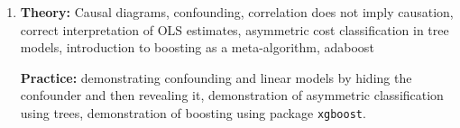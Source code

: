 \begin{enumerate}[(1)]
\item \textbf{Theory:} Causal diagrams, confounding, correlation does not imply causation, correct interpretation of OLS estimates, asymmetric cost classification in tree models, introduction to boosting as a meta-algorithm, adaboost

\textbf{Practice:} demonstrating confounding and linear models by hiding the confounder and then revealing it, demonstration of asymmetric classification using trees, demonstration of boosting using package \texttt{xgboost}.
\end{enumerate}

